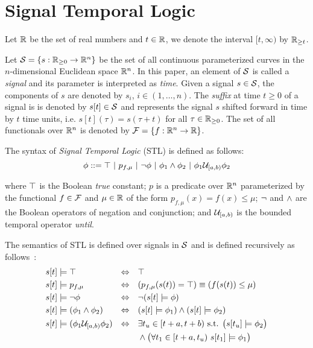 \section{Signal Temporal Logic}\label{sec:stl}

Let $\mathbb{R}$ be the set of real numbers and $t\in \mathbb{R}$, we denote the interval $[t, \infty)$ by $\mathbb{R}_{\geq t}$.

Let $\mathcal{S} = \{s :\mathbb{R}_{\geq 0} \to \mathbb{R}^n\}$ be the set of all continuous parameterized curves in the $n$-dimensional Euclidean space $\mathbb{R}^n$.
In this paper, an element of $\mathcal{S}$ is called a {\em signal} and its parameter is interpreted as {\em time}.
Given a signal $s \in \mathcal{S}$, the components of $s$ are denoted by $s_i$, $i \in (1, \dots, n)$. The {\em suffix} at time $t \geq 0$ of a signal is
is denoted by $s[t] \in \mathcal{S}$ and represents the signal $s$ shifted forward in time by $t$ time units, i.e. $s[t](\tau) = s(\tau+t)$ for all $\tau \in \mathbb{R}_{\geq 0}$. The set of all functionals over $\mathbb{R}^n$ is denoted by $\mathcal{F} = \{ f : \mathbb{R}^n \to \mathbb{R} \}$.

The syntax of {\em Signal Temporal Logic} (STL) \cite{maler_monitoring_2004} is defined as follows:
\begin{equation*}
\phi ::= \top \ |\  p_{f, \mu} \ |\ \neg \phi  \ |\ \phi_1 \wedge \phi_2 \ |\ \phi_1 \mathcal{U}_{[a, b)} \phi_2
\end{equation*}

where $\top$ is the Boolean {\em true} constant; $p$ is a predicate over $\mathbb{R}^n$ parameterized by the functional $f \in \mathcal{F}$ and $\mu \in \mathbb{R}$
of the form $p_{f, \mu}(x) = f(x) \leq \mu$; $\neg$ and $\wedge$ are the Boolean operators of negation and conjunction; and $\mathcal{U}_{[a, b)}$ is the bounded temporal operator {\em until}.

The semantics of STL is defined over signals in $\mathcal{S}$ and is
defined recursively as follows~\cite{maler_monitoring_2004}:
\begin{align*}
& s[t] \models \top &\Leftrightarrow \quad& \top \\
& s[t] \models p_{f, \mu} &\Leftrightarrow \quad& (p_{f, \mu}(s(t)) = \top) \equiv (f(s(t)) \leq \mu)\\
& s[t] \models \neg \phi &\Leftrightarrow \quad& \neg (s[t] \models \phi)\\
& s[t] \models (\phi_1 \wedge \phi_2) &\Leftrightarrow \quad& (s[t] \models \phi_1) \wedge (s[t] \models \phi_2)\\
& s[t] \models (\phi_1 \mathcal{U}_{[a, b)} \phi_2) &\Leftrightarrow \quad& \exists t_u \in [t+a, t+b) \text{ s.t. } \big(s[t_u] \models \phi_2\big)\\
& & & \wedge \big(\forall t_1 \in [t+a, t_u) \ s[t_1] \models \phi_1\big)
\end{align*}

